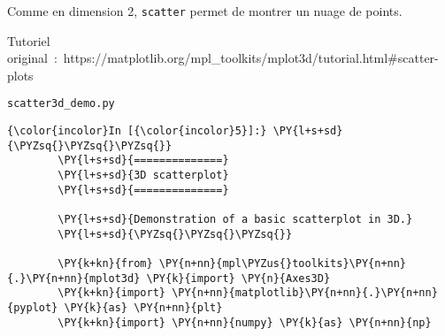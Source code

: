     Comme en dimension 2, \texttt{scatter} permet de montrer un nuage de
points.

Tutoriel
original~:~https://matplotlib.org/mpl\_toolkits/mplot3d/tutorial.html\#scatter-plots

    \texttt{scatter3d\_demo.py}

    \begin{Verbatim}[commandchars=\\\{\},frame=single,framerule=0.3mm,rulecolor=\color{cellframecolor}]
{\color{incolor}In [{\color{incolor}5}]:} \PY{l+s+sd}{\PYZsq{}\PYZsq{}\PYZsq{}}
        \PY{l+s+sd}{==============}
        \PY{l+s+sd}{3D scatterplot}
        \PY{l+s+sd}{==============}
        
        \PY{l+s+sd}{Demonstration of a basic scatterplot in 3D.}
        \PY{l+s+sd}{\PYZsq{}\PYZsq{}\PYZsq{}}
        
        \PY{k+kn}{from} \PY{n+nn}{mpl\PYZus{}toolkits}\PY{n+nn}{.}\PY{n+nn}{mplot3d} \PY{k}{import} \PY{n}{Axes3D}
        \PY{k+kn}{import} \PY{n+nn}{matplotlib}\PY{n+nn}{.}\PY{n+nn}{pyplot} \PY{k}{as} \PY{n+nn}{plt}
        \PY{k+kn}{import} \PY{n+nn}{numpy} \PY{k}{as} \PY{n+nn}{np}
\end{Verbatim}


